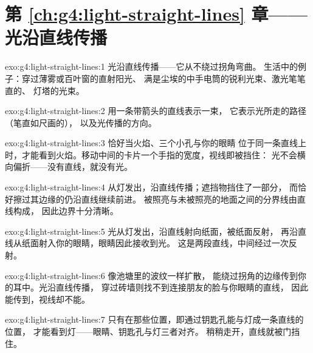 \section*{第 \ref{ch:g4:light-straight-lines} 章——光沿直线传播}

\begin{solution}{exo:g4:light-straight-lines:1}
光沿直线传播——它从不绕过拐角弯曲。
生活中的例子：穿过薄雾或百叶窗的直射阳光、
满是尘埃的中手电筒的锐利光束、激光笔笔直的、
灯塔的光束。
\end{solution}

\begin{solution}{exo:g4:light-straight-lines:2}
用一条带箭头的直线表示一束，
它表示光所走的路径（笔直如尺画的），
以及光传播的方向。
\end{solution}

\begin{solution}{exo:g4:light-straight-lines:3}
恰好当火焰、三个小孔与你的眼睛
位于同一条直线上时，才能看到火焰。移动中间的卡片一个手指的宽度，视线即被挡住：
光不会横向偏折——没有直线，就没有光。
\end{solution}

\begin{solution}{exo:g4:light-straight-lines:4}
从灯发出，沿直线传播；遮挡物挡住了一部分，
而恰好擦过其边缘的仍沿直线继续前进。
被照亮与未被照亮的地面之间的分界线由直线构成，
因此边界十分清晰。
\end{solution}

\begin{solution}{exo:g4:light-straight-lines:5}
光从灯发出，沿直线射向纸面，被纸面反射，
再沿直线从纸面射入你的眼睛，眼睛因此接收到光。
这是两段直线，中间经过一次反射。
\end{solution}

\begin{solution}{exo:g4:light-straight-lines:6}
像池塘里的波纹一样扩散，
能绕过拐角的边缘传到你的耳中。光沿直线传播，
穿过砖墙则找不到连接朋友的脸与你眼睛的直线，
因此能传到，视线却不能。
\end{solution}

\begin{solution}{exo:g4:light-straight-lines:7}
只有在那些位置，即通过钥匙孔能与灯成一条直线的位置，
才能看到灯——眼睛、钥匙孔与灯三者对齐。
稍稍走开，直线就被门挡住。
\end{solution}

